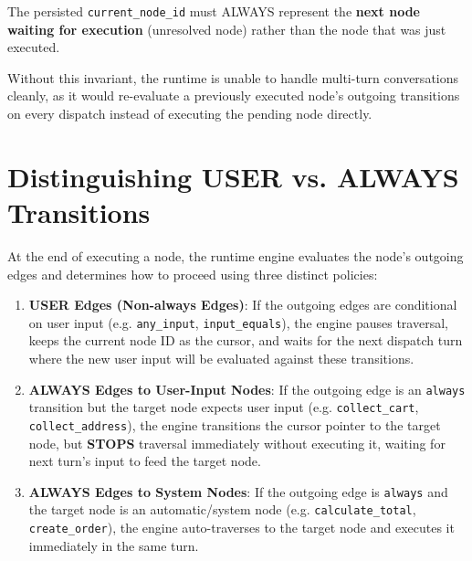 \documentclass[12pt, a4paper]{report}
\newenvironment{invariantbox}[1]{%
  \begin{tcolorbox}[
    colback=red!4!white,
    colframe=warningred,
    title={\textbf{INVARIANT: #1}},
    fonttitle=\small\bfseries
  ]
}{%
  \end{tcolorbox}
}
\begin{document}
\begin{invariantbox}{Traversal Cursor Invariant (INV-11)}
The persisted \texttt{current\_node\_id} must ALWAYS represent the \textbf{next node waiting for execution} (unresolved node) rather than the node that was just executed.
\end{invariantbox}

Without this invariant, the runtime is unable to handle multi-turn conversations cleanly, as it would re-evaluate a previously executed node's outgoing transitions on every dispatch instead of executing the pending node directly.

\section{Distinguishing USER vs. ALWAYS Transitions}

At the end of executing a node, the runtime engine evaluates the node's outgoing edges and determines how to proceed using three distinct policies:

\begin{enumerate}
  \item \textbf{USER Edges (Non-always Edges)}: If the outgoing edges are conditional on user input (e.g. \texttt{any\_input}, \texttt{input_equals}), the engine pauses traversal, keeps the current node ID as the cursor, and waits for the next dispatch turn where the new user input will be evaluated against these transitions.
  \item \textbf{ALWAYS Edges to User-Input Nodes}: If the outgoing edge is an \texttt{always} transition but the target node expects user input (e.g. \texttt{collect\_cart}, \texttt{collect\_address}), the engine transitions the cursor pointer to the target node, but \textbf{STOPS} traversal immediately without executing it, waiting for next turn's input to feed the target node.
  \item \textbf{ALWAYS Edges to System Nodes}: If the outgoing edge is \texttt{always} and the target node is an automatic/system node (e.g. \texttt{calculate\_total}, \texttt{create_order}), the engine auto-traverses to the target node and executes it immediately in the same turn.
\end{enumerate}
\end{document}
